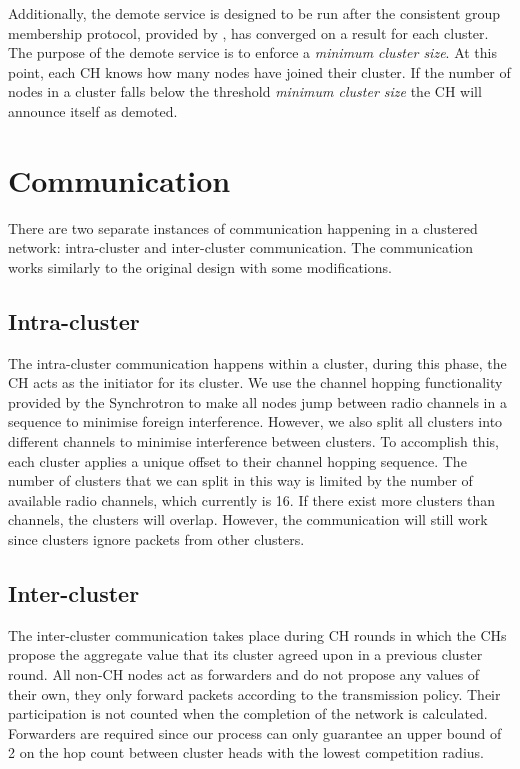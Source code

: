 Additionally, the demote service is designed to be run after the consistent group membership protocol, provided by \atwo{} \cite{a2-introduction-paper}, has converged on a result for each cluster. The purpose of the demote service is to enforce a \emph{minimum cluster size}. At this point, each CH knows how many nodes have joined their cluster. If the number of nodes in a cluster falls below the threshold \emph{minimum cluster size} the CH will announce itself as demoted.





\section{Communication}
There are two separate instances of communication happening in a clustered network: intra-cluster and inter-cluster communication. The communication works similarly to the original \atwo{} design with some modifications.


\subsection{Intra-cluster}
The intra-cluster communication happens within a cluster, during this phase, the CH acts as the initiator for its cluster. We use the channel hopping functionality provided by the \atwo{} Synchrotron \cite{a2-introduction-paper} to make all nodes jump between radio channels in a sequence to minimise foreign interference. However, we also split all clusters into different channels to minimise interference between clusters. To accomplish this, each cluster applies a unique offset to their channel hopping sequence. The number of clusters that we can split in this way is limited by the number of available radio channels, which currently is 16. If there exist more clusters than channels, the clusters will overlap. However, the communication will still work since clusters ignore packets from other clusters.


\subsection{Inter-cluster}
The inter-cluster communication takes place during CH rounds in which the CHs propose the aggregate value that its cluster agreed upon in a previous cluster round. All non-CH nodes act as forwarders and do not propose any values of their own, they only forward packets according to the transmission policy. Their participation is not counted when the completion of the network is calculated. Forwarders are required since our process can only guarantee an upper bound of 2 on the hop count between cluster heads with the lowest competition radius.


